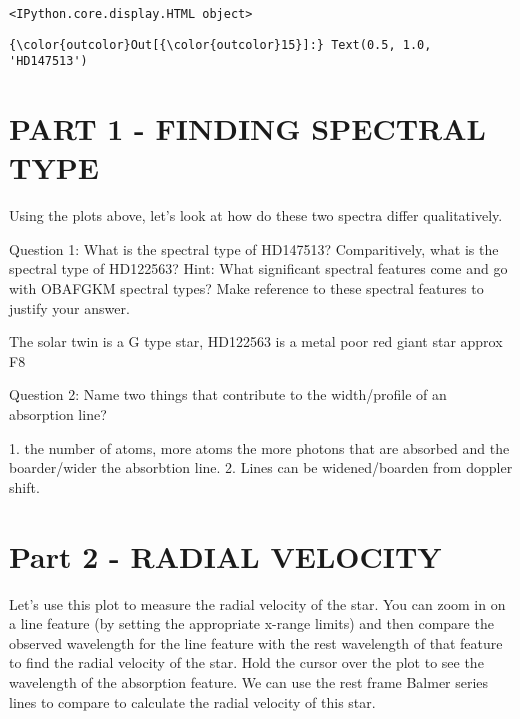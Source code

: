 \documentclass[11pt]{article}
\begin{document}
    
    
    \begin{verbatim}
<IPython.core.display.HTML object>
    \end{verbatim}

    
\begin{Verbatim}[commandchars=\\\{\}]
{\color{outcolor}Out[{\color{outcolor}15}]:} Text(0.5, 1.0, 'HD147513')
\end{Verbatim}
            
    \section{PART 1 - FINDING SPECTRAL
TYPE}\label{part-1---finding-spectral-type}

Using the plots above, let's look at how do these two spectra differ
qualitatively.

Question 1: What is the spectral type of HD147513? Comparitively, what
is the spectral type of HD122563? Hint: What significant spectral
features come and go with OBAFGKM spectral types? Make reference to
these spectral features to justify your answer.

     The solar twin is a G type star, HD122563 is a metal poor red giant
star approx F8 

    Question 2: Name two things that contribute to the width/profile of an
absorption line?

     1. the number of atoms, more atoms the more photons that are absorbed
and the boarder/wider the absorbtion line. 2. Lines can be
widened/boarden from doppler shift. 

    \section{Part 2 - RADIAL VELOCITY}\label{part-2---radial-velocity}

    Let's use this plot to measure the radial velocity of the star. You can
zoom in on a line feature (by setting the appropriate x-range limits)
and then compare the observed wavelength for the line feature with the
rest wavelength of that feature to find the radial velocity of the star.
Hold the cursor over the plot to see the wavelength of the absorption
feature. We can use the rest frame Balmer series lines to compare to
calculate the radial velocity of this star.
\end{document}
